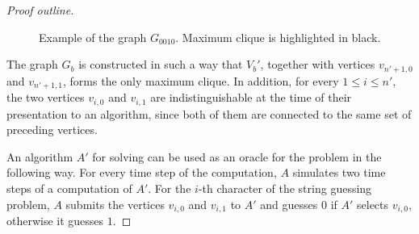 \begin{proof}[Proof outline]
\begin{figure}
        \caption{Example of the graph $G_{0010}$. Maximum clique is
            highlighted in black.}
        \label{fig:clique-example}
    \end{figure}

    The graph $G_b$ is constructed in such a way that $V_b'$, together
    with vertices $v_{n'+1, 0}$ and $v_{n'+1,1}$, forms the only maximum
    clique. In addition, for every $1 \leq i \leq n'$, the two vertices
    $v_{i,0}$ and $v_{i,1}$ are indistinguishable at the time of their
    presentation to an algorithm, since both of them are connected to the
    same set of preceding vertices.

    An algorithm $A'$ for solving  can be used as an
    oracle for the  problem in the following way. For every time
    step of the  computation, $A$ simulates two time steps of a
    computation of $A'$. For the $i$-th character of the string guessing
    problem, $A$ submits the vertices $v_{i,0}$ and $v_{i,1}$ to $A'$ and
    guesses $0$ if $A'$ selects $v_{i,0}$, otherwise it guesses $1$.


\end{proof}
